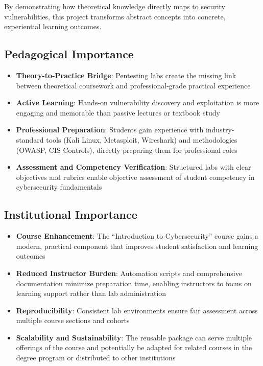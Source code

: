 By demonstrating how theoretical knowledge directly maps to security vulnerabilities, 
this project transforms abstract concepts into concrete, experiential learning outcomes.


\subsection{Pedagogical Importance}

\begin{itemize}
    \item \textbf{Theory-to-Practice Bridge}: Pentesting labs create the missing 
          link between theoretical coursework and professional-grade practical 
          experience
    
    \item \textbf{Active Learning}: Hands-on vulnerability discovery and 
          exploitation is more engaging and memorable than passive lectures 
          or textbook study
    
    \item \textbf{Professional Preparation}: Students gain experience with 
          industry-standard tools (Kali Linux, Metasploit, Wireshark) and 
          methodologies (OWASP, CIS Controls), directly preparing them for 
          professional roles
    
    \item \textbf{Assessment and Competency Verification}: Structured labs 
          with clear objectives and rubrics enable objective assessment of 
          student competency in cybersecurity fundamentals
\end{itemize}

\subsection{Institutional Importance}

\begin{itemize}
    \item \textbf{Course Enhancement}: The ``Introduction to Cybersecurity'' 
          course gains a modern, practical component that improves student 
          satisfaction and learning outcomes
    
    \item \textbf{Reduced Instructor Burden}: Automation scripts and comprehensive 
          documentation minimize preparation time, enabling instructors to focus 
          on learning support rather than lab administration
    
    \item \textbf{Reproducibility}: Consistent lab environments ensure fair 
          assessment across multiple course sections and cohorts
    
    \item \textbf{Scalability and Sustainability}: The reusable package can serve 
          multiple offerings of the course and potentially be adapted for related 
          courses in the degree program or distributed to other institutions
\end{itemize}

